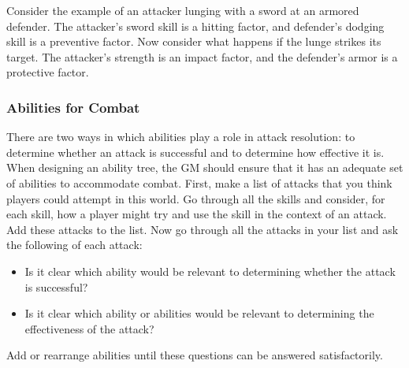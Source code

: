 Consider the example of an attacker lunging with a sword at an armored defender.
The attacker's sword skill is a hitting factor,
and defender's dodging skill is a preventive factor.
Now consider what happens if the lunge strikes its target.
The attacker's strength is an impact factor,
and the defender's armor is a protective factor.


\subsubsection{Abilities for Combat}
There are two ways in which abilities play a role in attack resolution:
to determine whether an attack is successful
and to determine how effective it is.
When designing an ability tree, the GM
should ensure that it has an adequate set of abilities
to accommodate combat.
First, make a list of attacks that you think players could attempt in this world.
Go through all the skills and consider, for each skill, how a player might try and use the skill
in the context of an attack. Add these attacks to the list.
Now go through all the attacks in your list and ask the following of each attack:
\vspace{-1em}\begin{itemize}
\item Is it clear which ability would be relevant to determining whether the attack is successful?
\item Is it clear which ability or abilities would be relevant to determining the effectiveness of the attack?
\end{itemize}
Add or rearrange abilities until these questions can be answered satisfactorily.

